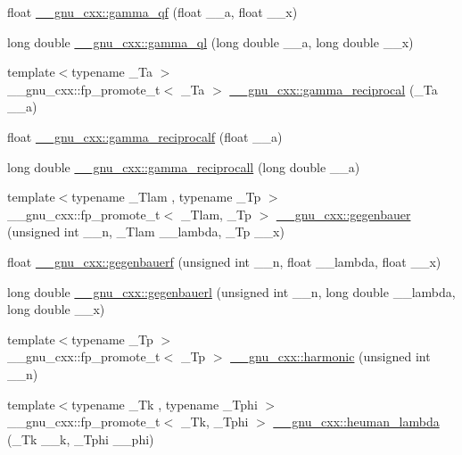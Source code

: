 \begin{DoxyCompactItemize}
float \hyperlink{group__mathsf__gnu_ga3ee8d2c40b904952538709cbb0e664a4}{\+\_\+\+\_\+gnu\+\_\+cxx\+::gamma\+\_\+qf} (float \+\_\+\+\_\+a, float \+\_\+\+\_\+x)
\item 
long double \hyperlink{group__mathsf__gnu_ga5364a098596681809294d25741539ffc}{\+\_\+\+\_\+gnu\+\_\+cxx\+::gamma\+\_\+ql} (long double \+\_\+\+\_\+a, long double \+\_\+\+\_\+x)
\item 
{\footnotesize template$<$typename \+\_\+\+Ta $>$ }\\\+\_\+\+\_\+gnu\+\_\+cxx\+::fp\+\_\+promote\+\_\+t$<$ \+\_\+\+Ta $>$ \hyperlink{group__mathsf__gnu_ga641f9bcdb8fc32a9a0ce7a15b5040076}{\+\_\+\+\_\+gnu\+\_\+cxx\+::gamma\+\_\+reciprocal} (\+\_\+\+Ta \+\_\+\+\_\+a)
\item 
float \hyperlink{group__mathsf__gnu_ga10cccd5045490ac24590c094c43107d8}{\+\_\+\+\_\+gnu\+\_\+cxx\+::gamma\+\_\+reciprocalf} (float \+\_\+\+\_\+a)
\item 
long double \hyperlink{group__mathsf__gnu_ga73bfcace13daa8b50e7e7e3f583a2eb0}{\+\_\+\+\_\+gnu\+\_\+cxx\+::gamma\+\_\+reciprocall} (long double \+\_\+\+\_\+a)
\item 
{\footnotesize template$<$typename \+\_\+\+Tlam , typename \+\_\+\+Tp $>$ }\\\+\_\+\+\_\+gnu\+\_\+cxx\+::fp\+\_\+promote\+\_\+t$<$ \+\_\+\+Tlam, \+\_\+\+Tp $>$ \hyperlink{group__mathsf__gnu_ga512e7981e328d6184f604de1892048b6}{\+\_\+\+\_\+gnu\+\_\+cxx\+::gegenbauer} (unsigned int \+\_\+\+\_\+n, \+\_\+\+Tlam \+\_\+\+\_\+lambda, \+\_\+\+Tp \+\_\+\+\_\+x)
\item 
float \hyperlink{group__mathsf__gnu_ga3eda0a3546848c5b3a2d4d9b5910d6b1}{\+\_\+\+\_\+gnu\+\_\+cxx\+::gegenbauerf} (unsigned int \+\_\+\+\_\+n, float \+\_\+\+\_\+lambda, float \+\_\+\+\_\+x)
\item 
long double \hyperlink{group__mathsf__gnu_ga1f1110d7a116bd5636924bb96d24ecc3}{\+\_\+\+\_\+gnu\+\_\+cxx\+::gegenbauerl} (unsigned int \+\_\+\+\_\+n, long double \+\_\+\+\_\+lambda, long double \+\_\+\+\_\+x)
\item 
{\footnotesize template$<$typename \+\_\+\+Tp $>$ }\\\+\_\+\+\_\+gnu\+\_\+cxx\+::fp\+\_\+promote\+\_\+t$<$ \+\_\+\+Tp $>$ \hyperlink{group__mathsf__gnu_gab052b72af9c7ec030bcea81965390614}{\+\_\+\+\_\+gnu\+\_\+cxx\+::harmonic} (unsigned int \+\_\+\+\_\+n)
\item 
{\footnotesize template$<$typename \+\_\+\+Tk , typename \+\_\+\+Tphi $>$ }\\\+\_\+\+\_\+gnu\+\_\+cxx\+::fp\+\_\+promote\+\_\+t$<$ \+\_\+\+Tk, \+\_\+\+Tphi $>$ \hyperlink{group__mathsf__gnu_ga7537f96eedc8571ed1987481b2863e89}{\+\_\+\+\_\+gnu\+\_\+cxx\+::heuman\+\_\+lambda} (\+\_\+\+Tk \+\_\+\+\_\+k, \+\_\+\+Tphi \+\_\+\+\_\+phi)

\end{DoxyCompactItemize}
